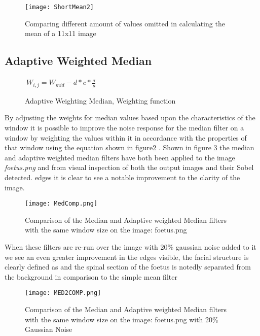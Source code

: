 \documentclass{article}
\begin{document}
\begin{figure}[h]
	\centering
	\texttt{[image: ShortMean2]}
	\caption{Comparing different amount of values omitted in calculating the mean of a 11x11 image}
	\label{fig:TrimmedMean}
\end{figure}

\subsection{Adaptive Weighted Median}
\begin{figure}
\centering
$\ W_{i,j} = W_{mid} - d * c * \frac{\sigma}{\mu} $\	
\caption{Adaptive Weighting Median, Weighting function}
\label{fig:ADMedFUNC}
\end{figure}


By adjusting the weights for median values based upon the characteristics of the window it is possible to improve the noise response for the median filter on a window by weighting the values within it in accordance with the properties of that window using the equation shown in figure\ref{fig:ADMedFUNC} \cite{Gonzalez:2016aa}. Shown in figure \ref{fig:MedComp} the median and adaptive weighted median filters have both been applied to the image \textit{foetus.png} and from visual inspection of both the output images and their Sobel detected. edges it is clear to see a notable improvement to the clarity of the image.


\begin{figure}[h!]
	\centering
	\texttt{[image: MedComp.png]}
	\caption{Comparison of the Median and Adaptive weighted Median filters with the same window size on the image: foetus.png}
	\label{fig:MedComp}
\end{figure}

When these filters are re-run over the image with 20\% gaussian noise added to it we see an even greater improvement in the edges visible, the facial structure is clearly defined as and the spinal section of the foetus is notedly separated from the background in comparison to the simple mean filter

\begin{figure}[h!]
	\centering
	\texttt{[image: MED2COMP.png]}
	\caption{Comparison of the Median and Adaptive weighted Median filters with the same window size on the image: foetus.png with 20\% Gaussian Noise}
	\label{fig:MED2COMP}
\end{figure}
\end{document}
